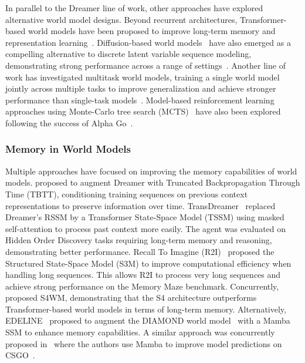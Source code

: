 In parallel to the Dreamer line of work, other approaches have explored alternative world model designs. Beyond recurrent architectures, Transformer-based world models have been proposed to improve long-term memory and representation learning~\citep{micheli2022transformers, chen2021transdreamer, robine2023transformer, zhang2023storm}. Diffusion-based world models~\citep{sohl2015deep} have also emerged as a compelling alternative to discrete latent variable sequence modeling, demonstrating strong performance across a range of settings~\citep{alonso2024diffusion, valevski2025diffusion, bar2025navigation, hafner2025training, hu2026multiplayer}. Another line of work has investigated multitask world models, training a single world model jointly across multiple tasks to improve generalization and achieve stronger performance than single-task models~\citep{hansen2024td, hansen2026learning}. Model-based reinforcement learning approaches using Monte-Carlo tree search (MCTS)~\citep{coulom2006efficient} have also been explored following the success of Alpha Go~\citep{silver2017mastering, silver2018general, schrittwieser2020mastering, ye2021mastering, wang2024efficientzero}.

\subsubsection{Memory in World Models}

Multiple approaches have focused on improving the memory capabilities of world models. \citet{pasukonis2023evaluating} proposed to augment Dreamer with Truncated Backpropagation Through Time (TBTT), conditioning training sequences on previous context representations to preserve information over time. TransDreamer~\citep{chen2021transdreamer} replaced Dreamer’s RSSM by a Transformer State-Space Model (TSSM) using masked self-attention to process past context more easily. The agent was evaluated on Hidden Order Discovery tasks requiring long-term memory and reasoning, demonstrating better performance. Recall To Imagine (R2I)~\citep{samsami2024mastering} proposed the Structured State-Space Model (S3M) to improve computational efficiency when handling long sequences. This allows R2I to process very long sequences and achieve strong performance on the Memory Maze benchmark. Concurrently,~\citet{deng2023facing} proposed S4WM, demonstrating that the S4 architecture outperforms Transformer-based
world models in terms of long-term memory. Alternatively, EDELINE~\citep{lee2025edeline} proposed to augment the DIAMOND world model~\citep{alonso2024diffusion} with a Mamba~\citep{gu2023mamba} SSM to enhance memory capabilities. A similar approach was concurrently proposed in~\citet{savov2025statespacediffuser} where the authors use Mamba to improve model predictions on CSGO~\citep{pearce2022counter}.

